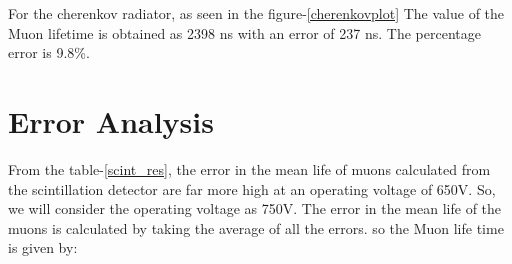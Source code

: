 \documentclass{article}
\begin{document}
\begin{multicols}{2}
\begin{table}[h]
    \centering
    \caption{The results of the fitted data from the Scintillation detector}
    \label{scint_res}
\end{table}


For the cherenkov radiator, as seen in the figure-\ref{cherenkovplot}
The value of the Muon lifetime is obtained as 2398 ns with an error of 237 ns. The percentage error is 9.8\%.

\section{\label{error}Error Analysis}

From the table-\ref{scint_res}, the error in the mean life of muons calculated from the scintillation detector are far more high at an operating voltage of 650V. So, we will consider the operating voltage as 750V. The error in the mean life of the muons is calculated by taking the average of all the errors.
so the Muon life time is given by:


\end{multicols}
\end{document}
